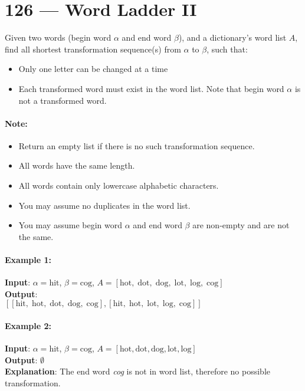 \section{126 --- Word Ladder II}
Given two words (begin word $\alpha$ and end word $\beta$), and a dictionary's word list $A$, find all shortest transformation sequence(s) from $\alpha$ to $\beta$, such that:
\begin{itemize}
\item Only one letter can be changed at a time
\item Each transformed word must exist in the word list. Note that begin word $\alpha$ is not a transformed word.
\end{itemize}
\paragraph{Note:}
\begin{itemize}
\item Return an empty list if there is no such transformation sequence.
\item All words have the same length.
\item All words contain only lowercase alphabetic characters.
\item You may assume no duplicates in the word list.
\item You may assume begin word $\alpha$ and end word $\beta$ are non-empty and are not the same.
\end{itemize}
\paragraph{Example 1:}
\begin{flushleft}
\textbf{Input}: $\alpha = \text{hit}$, $\beta = \text{cog}$, $A = [\text{hot},\;\text{dot},\;\text{dog},\;\text{lot},\;\text{log},\;\text{cog}]$
\\
\textbf{Output}:
\\
$[[\text{hit},\;\text{hot},\;\text{dot},\;\text{dog},\;\text{cog}], [\text{hit},\;\text{hot},\;\text{lot},\;\text{log},\;\text{cog}]]$
\end{flushleft}
\paragraph{Example 2:}
\begin{flushleft}
\textbf{Input}: $\alpha = \text{hit}$, $\beta = \text{cog}$, $A = [\text{hot}, \text{dot}, \text{dog}, \text{lot}, \text{log}]$
\\
\textbf{Output}: $\emptyset$
\\
\textbf{Explanation}: The end word \textit{cog} is not in word list, therefore no possible transformation.
\end{flushleft}
